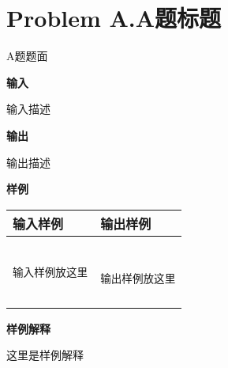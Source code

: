 \documentclass[11pt]{ctexart}
\begin{document}
\newpage
\section*{Problem A.A题标题}

A题题面

\textbf{输入}

输入描述

\textbf{输出}

输出描述

\textbf{样例}

\begin{table}[h!]
\centering
\begin{tabular}{|p{7cm}|p{7cm}|}
\hline
\textbf{输入样例} & \textbf{输出样例} \\
\hline
\begin{minipage}[t]{7cm}
\begin{verbatim}

输入样例放这里


\end{verbatim}
\end{minipage} &
\begin{minipage}[t]{7cm}
\begin{verbatim}

输出样例放这里

\end{verbatim}
\end{minipage} \\
\hline
\end{tabular}
\end{table}

\textbf{样例解释}

这里是样例解释



\end{document}
